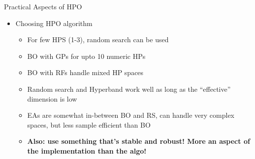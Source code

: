 \documentclass[11pt,compress,t,notes=noshow, xcolor=table]{beamer}
\begin{document}
\begin{vbframe}{Practical Aspects of HPO}
\begin{itemize}
    \item Choosing HPO algorithm
    \begin{itemize}
        \item For few HPS (1-3), random search can be used
        \item BO with GPs for upto 10 numeric HPs 
        \item BO with RFs handle mixed HP spaces
        \item Random search and Hyperband work well as long as the ``effective'' dimension is low
        \item EAs are somewhat in-between BO and RS, can handle very complex spaces, but less sample efficient than BO
        \item \textbf{Also: use something that's stable and robust! 
          More an aspect of the implementation than the algo!}
    \end{itemize}
\end{itemize}

\end{vbframe}

\end{document}
